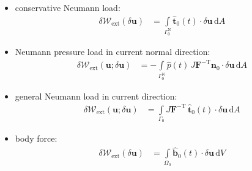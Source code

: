 \documentclass[a4paper,12pt]{report}
\newcommand{\Om}{\mathit{\Omega}}
\newcommand{\Gm}{\mathit{\Gamma}}
\begin{document}
\begin{itemize}
\item conservative Neumann load:
\begin{equation}
\label{equation-deltaw-ext-pk1}
\begin{aligned}
\delta \mathcal{W}_{\mathrm{ext}}(\delta\boldsymbol{u}) &= \int\limits_{\Gm_{0}^{\mathrm{N}}} \hat{\boldsymbol{t}}_{0}(t) \cdot \delta\boldsymbol{u} \,\mathrm{d}A
\end{aligned}
\end{equation}
\item Neumann pressure load in current normal direction:
\begin{equation}
\label{equation-deltaw-ext-cur-p}
\begin{aligned}
\delta \mathcal{W}_{\mathrm{ext}}(\boldsymbol{u};\delta\boldsymbol{u}) &= -\int\limits_{\Gm_{0}^{\mathrm{N}}} \hat{p}(t)\,J \boldsymbol{F}^{-\mathrm{T}}\boldsymbol{n}_{0} \cdot \delta\boldsymbol{u} \,\mathrm{d}A \end{aligned}
\end{equation}
\item general Neumann load in current direction:
\begin{equation}
\label{equation-deltaw-ext-cur}
\begin{aligned}
\delta \mathcal{W}_{\mathrm{ext}}(\boldsymbol{u};\delta\boldsymbol{u}) &= \int\limits_{\Gm_0} J\boldsymbol{F}^{-\mathrm{T}}\,\hat{\boldsymbol{t}}_{0}(t) \cdot \delta\boldsymbol{u} \,\mathrm{d}A
\end{aligned}
\end{equation}
\item body force:
\begin{equation}
\label{equation-deltaw-ext-body}
\begin{aligned}
\delta \mathcal{W}_{\mathrm{ext}}(\delta\boldsymbol{u}) &= \int\limits_{\Om_{0}} \hat{\boldsymbol{b}}_{0}(t) \cdot \delta\boldsymbol{u} \,\mathrm{d}V
\end{aligned}
\end{equation}


\end{itemize}
\end{document}
